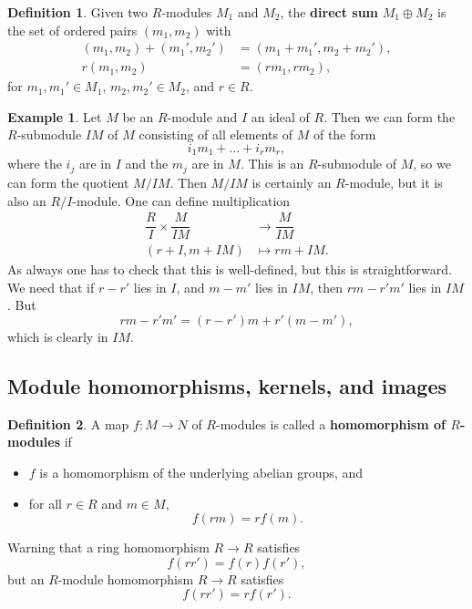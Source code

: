 \documentclass{article}
\newcommand{\rb}[1]{\left( #1 \right)}
\theoremstyle{definition}\newtheorem{definition}{Definition}[subsection]
\theoremstyle{definition}\newtheorem{remark}[definition]{Remark}
\theoremstyle{definition}\newtheorem*{example}{Example}
\theoremstyle{definition}\newtheorem*{note}{Note}
\begin{document}
\begin{definition}
Given two $ R $-modules $ M_1 $ and $ M_2 $, the \textbf{direct sum} $ M_1 \oplus M_2 $ is the set of ordered pairs $ \rb{m_1, m_2} $ with
\begin{align*}
\rb{m_1, m_2} + \rb{m_1', m_2'} & = \rb{m_1 + m_1', m_2 + m_2'}, \\
r\rb{m_1, m_2} & = \rb{rm_1, rm_2},
\end{align*}
for $ m_1, m_1' \in M_1 $, $ m_2, m_2' \in M_2 $, and $ r \in R $.
\end{definition}

\begin{example}
Let $ M $ be an $ R $-module and $ I $ an ideal of $ R $. Then we can form the $ R $-submodule $ IM $ of $ M $ consisting of all elements of $ M $ of the form
$$ i_1m_1 + \dots + i_rm_r, $$
where the $ i_j $ are in $ I $ and the $ m_j $ are in $ M $. This is an $ R $-submodule of $ M $, so we can form the quotient $ M / IM $. Then $ M / IM $ is certainly an $ R $-module, but it is also an $ R / I $-module. One can define multiplication
\begin{align*}
\dfrac{R}{I} \times \dfrac{M}{IM} & \to \dfrac{M}{IM} \\
\rb{r + I, m + IM} & \mapsto rm + IM.
\end{align*}
As always one has to check that this is well-defined, but this is straightforward. We need that if $ r - r' $ lies in $ I $, and $ m - m' $ lies in $ IM $, then $ rm - r'm' $ lies in $ IM $. But
$$ rm - r'm' = \rb{r - r'}m + r'\rb{m - m'}, $$
which is clearly in $ IM $.
\end{example}

\subsection{Module homomorphisms, kernels, and images}

\begin{definition}
A map $ f : M \to N $ of $ R $-modules is called a \textbf{homomorphism of $ R $-modules} if
\begin{itemize}
\item $ f $ is a homomorphism of the underlying abelian groups, and
\item for all $ r \in R $ and $ m \in M $,
$$ f\rb{rm} = rf\rb{m}. $$
\end{itemize}
\end{definition}

Warning that a ring homomorphism $ R \to R $ satisfies
$$ f\rb{rr'} = f\rb{r}f\rb{r'}, $$
but an $ R $-module homomorphism $ R \to R $ satisfies
$$ f\rb{rr'} = rf\rb{r'}. $$
\end{document}
